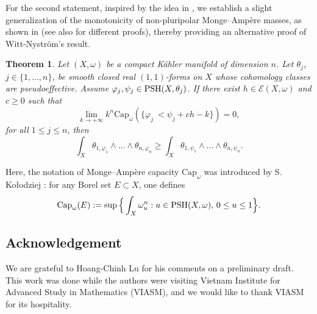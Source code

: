 \documentclass[a4paper]{amsart}
\numberwithin{equation}{section}
\newtheorem{theorem}{Theorem}[section]
\newtheorem{corollary}[theorem]{Corollary}
\theoremstyle{definition}
\numberwithin{equation}{section}
\newcommand{\capK}{\text{Cap}}
\newcommand{\PSH}{{\rm PSH}}
\begin{document}
For the second statement,
 inspired by the idea in \cite{Ahag09-MA-pluripolar}, we establish a slight generalization of the monotonicity of non-pluripolar Monge--Ampère masses, as shown in \cite{wittnystrom19-monotonicity} (see also \cite{vu2021relative,lu2022hessian,lu2021capacities} for different proofs), thereby providing an alternative proof of Witt-Nystr\"om's result.
\begin{theorem}\label{mainthm}
Let $(X, \omega)$ be a compact K\"{a}hler manifold of dimension $n$. Let $\theta_j$, $j\in\{1,\ldots,n\}$, be smooth closed real $(1,1)$-forms on $X$ whose cohomology classes are pseudoeffective. Assume $\varphi_j,\psi_j \in \PSH (X,\theta_j )$. If there exist $h \in \mathcal E (X, \omega )$ and $c\geq 0$ such that 
$$\lim\limits_{ k\to+\infty }k^n \capK_{\omega} ( \{ \varphi_j \ < \psi_j+ c h - k \} ) = 0,$$
for all $1\leq j\leq n$, then 
$$\int_X  \theta_{ 1, \varphi_1 }\wedge ...\wedge \theta_{ n, \varphi_n }  \geq \int_X  \theta_{ 1, \psi_1 }\wedge ...\wedge \theta_{ n, \psi_n }  .$$
\end{theorem}
Here, the notation of Monge--Ampère capacity $\capK_\omega$ was introduced by S. Ko\l odziej \cite{kolodziej2003monge}: for any Borel set $E\subset X$, one defines
$$\capK_{ \omega }(E):=\sup\Big\{\int_X\omega_u^n: u\in\PSH(X,\omega),\, 0\leq u\leq 1 \Big\}.$$ 








\subsection*{Acknowledgement} We are grateful to Hoang-Chinh Lu for his  comments on
a preliminary draft.  
This work was done while the authors were visiting Vietnam Institute for Advanced Study in Mathematics (VIASM), and we would like to thank VIASM for its hospitality.
\end{document}
